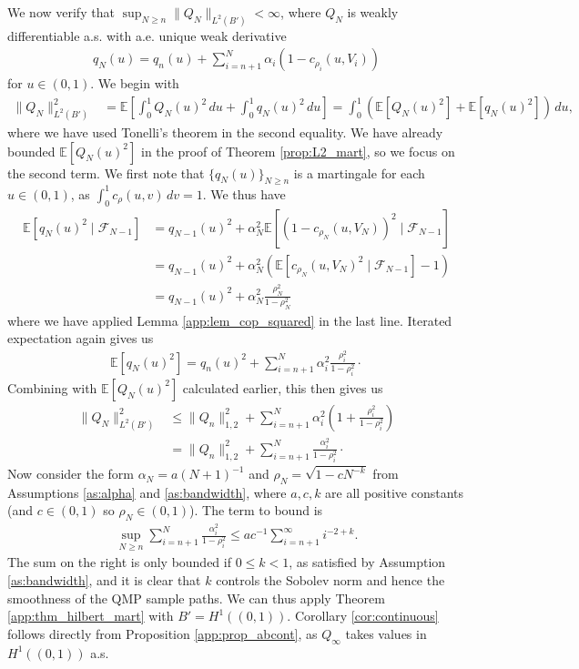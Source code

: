 \documentclass[11pt,a4paper]{article}
\newcommand{\E}{\mathbb{E}}
\begin{document}
\begin{appendices}
We now verify that $\sup_{N \geq n} \|Q_N\|_{L^2(B')}< \infty$, where $Q_N$ is weakly differentiable a.s. with a.e. unique weak derivative
\begin{align*}
    q_N(u) = q_n(u) + \sum_{i = n+1}^N \alpha_i \left(1- c_{\rho_i}(u,V_i)\right)
\end{align*}
for $u \in (0,1)$. We begin with
\begin{align*}
    \|Q_N \|^2_{L^2(B')}&= \E\left[\int_0^1 Q_N(u)^2\,du + \int_0^1 q_N(u)^2\,du\right]=\int_0^1\left(\E\left[Q_N(u)^2\right] +\E\left[q_N(u)^2\right] \right)\,du,
\end{align*}
where we have used Tonelli's theorem in the second equality. We have already  bounded $\E[Q_N(u)^2]$ in the proof of {Theorem \ref{prop:L2_mart}}, so we focus on the second term. We first note that $\{q_N(u)\}_{N \geq n}$ is a martingale for each $u \in (0,1)$, as $\int_0^1 c_\rho(u,v) \, dv = 1$. We thus have
\begin{align*}
    \E\left[q_N(u)^2 \mid \mathcal{F}_{N-1}\right] &= q_{N-1}(u)^2 + \alpha_N^2 \E\left[(1-c_{\rho_N}(u,V_N))^2\mid \mathcal{F}_{N-1}\right]\\
    &=q_{N-1}(u)^2 + \alpha_N^2 \left(\E\left[c_{\rho_N}(u,V_N)^2\mid \mathcal{F}_{N-1}\right]-1\right)\\
    &=q_{N-1}(u)^2 + \alpha_N^2 \frac{\rho_N^2}{1-\rho_N^2}
\end{align*}
where we have applied {Lemma \ref{app:lem_cop_squared}} in the last line. Iterated expectation again gives us
\begin{align*}
   \E\left[q_N(u)^2\right]  =q_n(u)^2 + \sum_{i = n+1}^N \alpha_i^2 \frac{\rho_i^2}{1-\rho_i^2}\cdot
\end{align*}
Combining with $\E[Q_N(u)^2]$ calculated earlier, this then gives us
\begin{align*}
    \|Q_N\|^2_{L^2(B')} &\leq \|Q_n\|^2_{1,2} + \sum_{i = n+1}^N \alpha_i^2 \left(1 + \frac{\rho_i^2}{1-\rho_i^2}\right)\\
    &=\|Q_n\|^2_{1,2} + \sum_{i = n+1}^N \frac{\alpha_i^2}{1-\rho_i^2}\cdot
\end{align*}
Now consider the form $\alpha_N = a(N+1)^{-1}$ and $\rho_N = \sqrt{1-cN^{-k}}$ from {Assumptions \ref{as:alpha}} and {\ref{as:bandwidth}}, where $a,c,k$ are all positive constants (and $c \in (0,1)$ so $\rho_N \in (0,1)$). The term to bound is
\begin{align*}
     \sup_{N \geq n}\sum_{i = n+1}^N \frac{\alpha_i^2}{1-\rho_i^2} \leq   ac^{-1}\sum_{i = n+1}^\infty i^{-2+k}. 
\end{align*}
The sum on the right is only bounded if $0\leq k < 1$, as satisfied by {Assumption \ref{as:bandwidth}}, and it is clear that $k$ controls the Sobolev norm and hence the smoothness of the QMP sample paths. We can thus apply {Theorem \ref{app:thm_hilbert_mart}} with $B' = H^1((0,1))$. {Corollary \ref{cor:continuous}} follows directly from {Proposition \ref{app:prop_abcont}}, as $Q_\infty$ takes values in $H^1((0,1))$ a.s.


\end{appendices}
\end{document}
